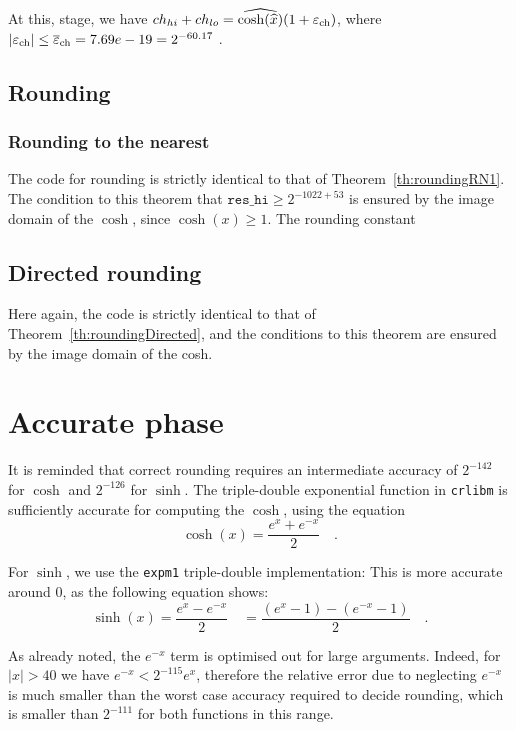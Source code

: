 At this, stage, we have $ch_{hi} + ch_{lo} = \widehat{\cosh(\widehat{x})}(1+\varepsilon_{\mathrm{ch}})$, where  $|\varepsilon_{\mathrm{ch}}| \leq {\overline{\varepsilon}}_{\mathrm{ch}} = 7.69e-19 = 2^{-60.17}$ .


\subsection{Rounding}

\subsubsection{Rounding to the nearest}

The code for rounding is strictly identical to that of
Theorem~\ref{th:roundingRN1}.  The condition to this theorem that
$\mathtt{res\_hi}\ge 2^{-1022+53}$ is ensured by the image domain of
the $\cosh$, since $\cosh(x) \geq 1$. The rounding constant

\subsection{Directed rounding}
Here again, the code is strictly identical to that of
Theorem~\ref{th:roundingDirected}, and the conditions to this theorem
are ensured by the image domain of the cosh.




\section{Accurate phase}

It is reminded that correct rounding requires an intermediate accuracy
of $2^{-142}$ for $\cosh$ and $2^{-126}$ for $\sinh$. The
triple-double exponential function in \texttt{crlibm} is sufficiently
accurate for computing the $\cosh$, using the equation
 $$\cosh(x) = \frac{e^x +  e^{-x}}{2}\quad.$$

 For $\sinh$, we use the \texttt{expm1} triple-double implementation:
 This is more accurate around $0$, as the following equation shows:
 $$\sinh(x) = \frac{e^x -  e^{-x}}{2}\quad = \frac{(e^x-1) -  (e^{-x}-1)}{2}\quad .$$

 As already noted, the $e^{-x}$ term is optimised out for large
 arguments. Indeed, for $|x|>40$ we have $e^{-x}<2^{-115}e^x$,
 therefore the relative error due to neglecting $e^{-x}$ is much
 smaller than the worst case accuracy required to decide rounding,
 which is smaller than $2^{-111}$ for both functions in this range.



